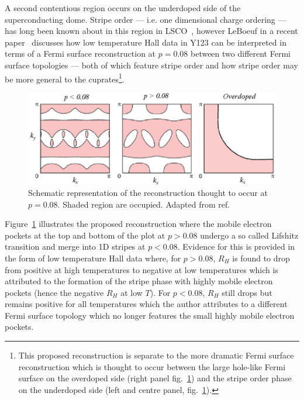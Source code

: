 A second contentious region occurs on the underdoped side of the superconducting dome. Stripe order --- i.e. one dimensional charge ordering --- has long been known about in this region in \ac{LSCO}~\cite{Kivelson2003}, however LeBoeuf \etal{} in a recent paper~\cite{LeBoeuf2011} discusses how low temperature Hall data in \ac{Y123} can be interpreted in terms of a Fermi surface reconstruction at $p=0.08$ between two different Fermi surface topologies --- both of which feature stripe order and how stripe order may be more general to the cuprates\footnote{This proposed reconstruction is separate to the more dramatic Fermi surface reconstruction which is thought to occur between the large hole-like Fermi surface on the overdoped side (right panel fig.~\ref{Fig:Intro:LifshitzReconstruction}) and the stripe order phase on the underdoped side (left and centre panel, fig.~\ref{Fig:Intro:LifshitzReconstruction}).}.
\begin{figure}[htbp]
    \begin{center}
        \includegraphics[scale=0.9]{Chapter-Introduction/Figures/LifshitzReconstruction/LifshitzReconstruction}
        \caption{Schematic representation of the reconstruction thought to occur at $p=0.08$. Shaded region are occupied. Adapted from ref.~\cite{Vojta2011}}
        \label{Fig:Intro:LifshitzReconstruction}
    \end{center}
\end{figure}
Figure~\ref{Fig:Intro:LifshitzReconstruction} illustrates the proposed reconstruction where the mobile electron pockets at the top and bottom of the plot at $p > 0.08$ undergo a so called Lifshitz transition and merge into 1D stripes at $p < 0.08$.  Evidence for this is provided in the form of low temperature Hall data where, for $p > 0.08$, $R_H$ is found to drop from positive at high temperatures to negative at low temperatures which is attributed to the formation of the stripe phase with highly mobile electron pockets (hence the negative $R_H$ at low $T$). For $p < 0.08$, $R_H$ still drops but remains positive for all temperatures which the author attributes to a different Fermi surface topology which no longer features the small highly mobile electron pockets. 

